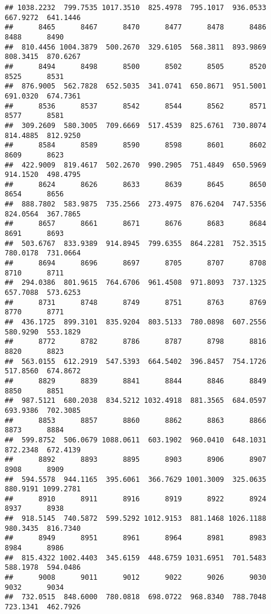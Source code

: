 \documentclass[
]{article}
\begin{document}
\begin{verbatim}
## 1038.2232  799.7535 1017.3510  825.4978  795.1017  936.0533  667.9272  641.1446 
##      8465      8467      8470      8477      8478      8486      8488      8490 
##  810.4456 1004.3879  500.2670  329.6105  568.3811  893.9869  808.3415  870.6267 
##      8494      8498      8500      8502      8505      8520      8525      8531 
##  876.9005  562.7828  652.5035  341.0741  650.8671  951.5001  691.0320  674.7361 
##      8536      8537      8542      8544      8562      8571      8577      8581 
##  309.2609  580.3005  709.6669  517.4539  825.6761  730.8074  814.4885  812.9250 
##      8584      8589      8590      8598      8601      8602      8609      8623 
##  422.9009  819.4617  502.2670  990.2905  751.4849  650.5969  914.1520  498.4795 
##      8624      8626      8633      8639      8645      8650      8654      8656 
##  888.7802  583.9875  735.2566  273.4975  876.6204  747.5356  824.0564  367.7865 
##      8657      8661      8671      8676      8683      8684      8691      8693 
##  503.6767  833.9389  914.8945  799.6355  864.2281  752.3515  780.0178  731.0664 
##      8694      8696      8697      8705      8707      8708      8710      8711 
##  294.0386  801.9615  764.6706  961.4508  971.8093  737.1325  657.7088  573.6253 
##      8731      8748      8749      8751      8763      8769      8770      8771 
##  436.1725  899.3101  835.9204  803.5133  780.0898  607.2556  580.9290  553.1829 
##      8772      8782      8786      8787      8798      8816      8820      8823 
##  563.0155  612.2919  547.5393  664.5402  396.8457  754.1726  517.8560  674.8672 
##      8829      8839      8841      8844      8846      8849      8850      8851 
##  987.5121  680.2038  834.5212 1032.4918  881.3565  684.0597  693.9386  702.3085 
##      8853      8857      8860      8862      8863      8866      8873      8884 
##  599.8752  506.0679 1088.0611  603.1902  960.0410  648.1031  872.2348  672.4139 
##      8892      8893      8895      8903      8906      8907      8908      8909 
##  594.5578  944.1165  395.6061  366.7629 1001.3009  325.0635  880.9191 1099.2781 
##      8910      8911      8916      8919      8922      8924      8937      8938 
##  918.5145  740.5872  599.5292 1012.9153  881.1468 1026.1188  980.3435  816.7340 
##      8949      8951      8961      8964      8981      8983      8984      8986 
##  815.4322 1002.4403  345.6159  448.6759 1031.6951  701.5483  588.1978  594.0486 
##      9008      9011      9012      9022      9026      9030      9032      9034 
##  732.0515  848.6000  780.0818  698.0722  968.8340  788.7048  723.1341  462.7926 

\end{verbatim}
\end{document}
